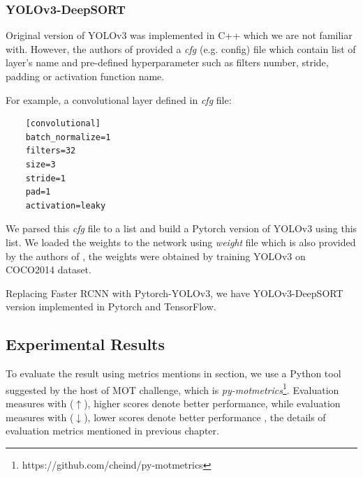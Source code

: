 \subsubsection{YOLOv3-DeepSORT}
\hspace{0.5cm}Original version of YOLOv3 was implemented in C++ which we are not familiar with. However, the authors of \cite{yolov3} provided a \textit{cfg} (e.g. config) file which contain list of layer's name and pre-defined hyperparameter 
such as filters number, stride, padding or activation function name.\par For example, a convolutional layer defined in \textit{cfg} file:
\begin{lstlisting}
    [convolutional]
    batch_normalize=1
    filters=32
    size=3
    stride=1
    pad=1
    activation=leaky
\end{lstlisting}
We parsed this \textit{cfg} file to a list and build a Pytorch version of YOLOv3 using this list. We loaded the weights to the network using \textit{weight} file which is also provided by the authors of \cite{yolov3},
 the weights were obtained by training YOLOv3 on COCO2014 dataset.\par
Replacing Faster RCNN with Pytorch-YOLOv3, we have YOLOv3-DeepSORT version implemented in Pytorch and TensorFlow.

\subsection{Experimental Results}
\hspace{0.5cm}To evaluate the result using metrics mentions in section, we use a Python tool suggested by the host of MOT challenge, which is \textit{py-motmetrics}\footnote{https://github.com/cheind/py-motmetrics}.
Evaluation measures with ($\uparrow$), higher scores denote better performance, while evaluation measures with ($\downarrow$), lower scores denote better performance \cite{sort}, the details of evaluation metrics mentioned in previous chapter.\par
